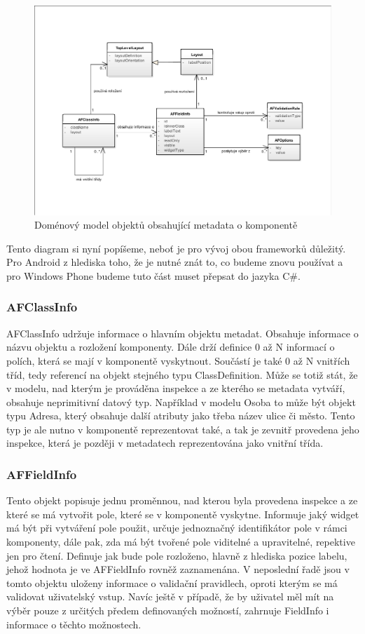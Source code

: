 \begin{figure}[h!]
\includegraphics[width=\textwidth]{figures/domainModel}
\caption{Doménový model objektů obsahující metadata o komponentě}
\label{img:metadataModel}
\end{figure}

Tento diagram si nyní popíšeme, neboť je pro vývoj obou frameworků důležitý. Pro Android z hlediska toho, že je nutné znát to, co budeme znovu používat a pro Windows Phone budeme tuto část muset přepsat do jazyka C\#.
\subsubsection{AFClassInfo}
AFClassInfo udržuje informace o hlavním objektu metadat. Obsahuje informace o názvu objektu a rozložení komponenty. Dále drží definice 0 až N informací o polích, která se mají v komponentě vyskytnout. Součástí je také 0 až N vnitřích tříd, tedy referencí na objekt stejného typu ClassDefinition. Může se totiž stát, že v modelu, nad kterým je prováděna inspekce a ze kterého se metadata vytváří, obsahuje neprimitivní datový typ. Například v modelu Osoba to může být objekt typu Adresa, který obsahuje další atributy jako třeba název ulice či město. Tento typ je ale nutno v komponentě reprezentovat také, a tak je zevnitř provedena jeho inspekce, která je později v metadatech reprezentována jako vnitřní třída. 

\subsubsection{AFFieldInfo}
Tento objekt popisuje jednu proměnnou, nad kterou byla provedena inspekce a ze které se má vytvořit pole, které se v komponentě vyskytne. Informuje jaký widget má být při vytváření pole použit, určuje jednoznačný identifikátor pole v rámci komponenty, dále pak, zda má být tvořené pole viditelné a upravitelné, repektive jen pro čtení. Definuje jak bude pole rozloženo, hlavně z hlediska pozice labelu, jehož hodnota je ve AFFieldInfo rovněž zaznamenána. V neposlední řadě jsou v tomto objektu uloženy informace o validační pravidlech, oproti kterým se má validovat uživatelský vstup. Navíc ještě v případě, že by uživatel měl mít na výběr pouze z určitých předem definovaných možností, zahrnuje FieldInfo i informace o těchto možnostech. 

